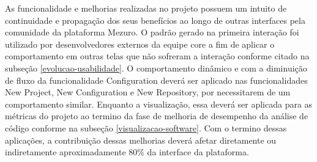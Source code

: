 As funcionalidade e melhorias realizadas no projeto possuem um intuito de continuidade e propagação dos seus benefícios ao longo de outras interfaces pela comunidade da plataforma Mezuro. O padrão gerado na primeira interação foi utilizado por desenvolvedores externos da equipe core a fim de aplicar o comportamento em outras telas que não sofreram a interação conforme citado na subseção \ref{evolucao-usabilidade}. O comportamento dinâmico e com a diminuição de fluxo da funcionalidade Configuration deverá ser aplicado nas funcionalidades New Project, New Configuration e New Repository, por necessitarem de um comportamento similar. Enquanto a visualização, essa deverá ser aplicada para as métricas do projeto ao termino da fase de melhoria de desempenho da análise de código conforme na subseção \ref{visualizacao-software}. Com o termino dessas aplicações, a contribuição dessas melhorias deverá afetar diretamente ou indiretamente aproximadamente 80\% da interface da plataforma.

